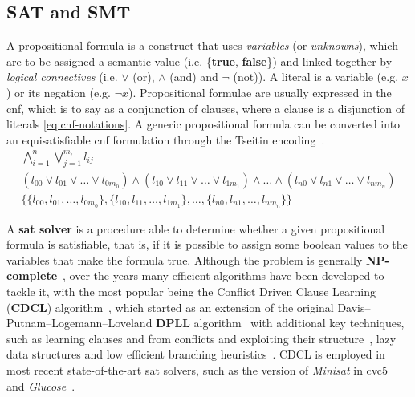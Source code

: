 \documentclass[runningheads]{llncs}
\begin{document}
\subsection{SAT and SMT}

A propositional formula is a construct that uses \textit{variables} (or \textit{unknowns}), which are to be assigned a semantic value (i.e. \{\textbf{true}, \textbf{false}\}) and linked together by \textit{logical connectives} (i.e. $\lor$ (or), $\land$ (and) and $\neg$ (not)).
A literal is a variable (e.g. $x$) or its negation (e.g. $\neg x$).
Propositional formulae are usually expressed in the \gls{cnf}, which is to say as a conjunction of clauses, where a clause is a disjunction of literals \eqref{eq:cnf-notations}.
A generic propositional formula can be converted into an equisatisfiable \gls{cnf} formulation through the Tseitin encoding~\cite{ref:handbook-sat}.
\begin{equation}
    \label{eq:cnf-notations}
    \begin{gathered}
        \bigwedge_{i=1}^n \bigvee_{j=1}^{m_i} l_{ij} \\
        ( l_{00} \lor l_{01} \lor \dots \lor l_{0m_0}) \land (l_{10} \lor l_{11} \lor \dots \lor l_{1m_1}) \land \dots \land (l_{n0} \lor l_{n1} \lor \dots \lor l_{nm_n}) \\
        \{ \{ l_{00}, l_{01} , \dots , l_{0m_0} \} , \{ l_{10} , l_{11} , \dots , l_{1m_1} \}, \dots , \{ l_{n0} , l_{n1} , \dots , l_{nm_n} \} \}
    \end{gathered}
\end{equation}

A \textbf{\gls{sat} solver} is a procedure able to determine whether a given propositional formula is satisfiable, that is, if it is possible to assign some boolean values to the variables that make the formula true.
Although the problem is generally \textbf{NP-complete}~\cite{ref:np-sat}, over the years many efficient algorithms have been developed to tackle it, with the most popular being the Conflict Driven Clause Learning (\textbf{CDCL}) algorithm~\cite{ref:handbook-sat}, which started as an extension of the original Davis–Putnam–Logemann–Loveland \textbf{DPLL} algorithm~\cite{ref:dpll} with additional key techniques, such as learning clauses and from conflicts and exploiting their structure~\cite{ref:conflict-driven-clause-learning}, lazy data structures and low efficient branching heuristics~\cite{ref:watched-literals}.
CDCL is employed in most recent state-of-the-art \gls{sat} solvers, such as the version of \textit{Minisat} in cvc5~\cite{ref:cvc5-smt-comp-2022} and \textit{Glucose}~\cite{ref:glucose}.
\end{document}
